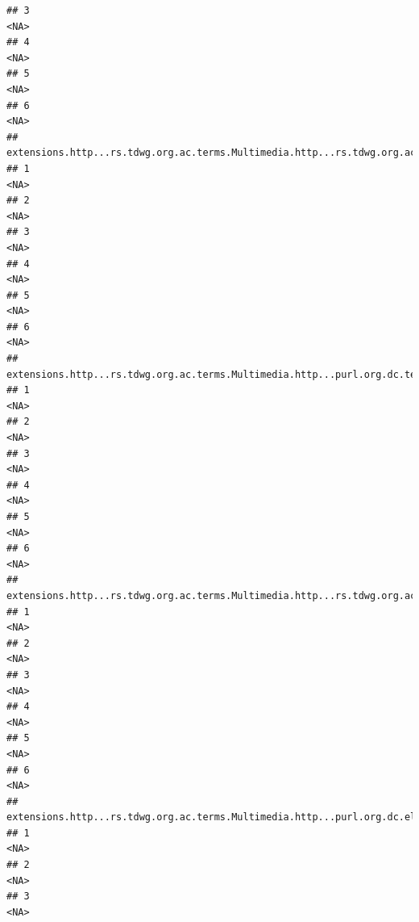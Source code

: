 \documentclass[
]{book}
\begin{document}
\begin{verbatim}
## 3                                                                                     <NA>
## 4                                                                                     <NA>
## 5                                                                                     <NA>
## 6                                                                                     <NA>
##   extensions.http...rs.tdwg.org.ac.terms.Multimedia.http...rs.tdwg.org.ac.terms.caption
## 1                                                                                  <NA>
## 2                                                                                  <NA>
## 3                                                                                  <NA>
## 4                                                                                  <NA>
## 5                                                                                  <NA>
## 6                                                                                  <NA>
##   extensions.http...rs.tdwg.org.ac.terms.Multimedia.http...purl.org.dc.terms.title
## 1                                                                             <NA>
## 2                                                                             <NA>
## 3                                                                             <NA>
## 4                                                                             <NA>
## 5                                                                             <NA>
## 6                                                                             <NA>
##   extensions.http...rs.tdwg.org.ac.terms.Multimedia.http...rs.tdwg.org.ac.terms.accessURI
## 1                                                                                    <NA>
## 2                                                                                    <NA>
## 3                                                                                    <NA>
## 4                                                                                    <NA>
## 5                                                                                    <NA>
## 6                                                                                    <NA>
##   extensions.http...rs.tdwg.org.ac.terms.Multimedia.http...purl.org.dc.elements.1.1.source
## 1                                                                                     <NA>
## 2                                                                                     <NA>
## 3                                                                                     <NA>

\end{verbatim}
\end{document}
